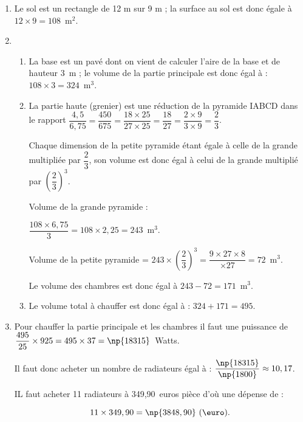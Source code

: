 \begin{enumerate}
\item %
Le sol est un rectangle de 12 m sur 9 m  ; la surface au sol est donc égale à $12 \times 9 = 108$~m$^2$.
\item %


%

	\begin{enumerate}
		\item %
La base est un pavé dont on vient de calculer l'aire de la base et de hauteur 3~m ; le volume de la partie principale est donc égal à : $108 \times 3 = 324$~m$^3$.
		\item %
La partie haute (grenier) est une réduction de la pyramide IABCD dans le rapport $\dfrac{4,5}{6,75} = \dfrac{450}{675} = \dfrac{18 \times 25}{27 \times 25} = \dfrac{18}{27}  = \dfrac{2 \times 9}{3 \times 9} = \dfrac{2}{3}$.

Chaque dimension de la petite pyramide étant égale à celle de la grande multipliée par $\dfrac{2}{3}$, son volume est donc égal à celui de la grande multiplié par $\left(\dfrac{2}{3} \right)^3$.

Volume de la grande pyramide :

$\dfrac{108 \times 6,75}{3} = 108 \times 2,25 = 243$~m$^3$.

Volume de la petite pyramide = $243 \times \left(\dfrac{2}{3} \right)^3 = \dfrac{9 \times 27 \times 8}{\times 27} = 72$~m$^3$.

Le volume des chambres est donc égal à $243 - 72 = 171$~m$^3$.
		\item %
Le volume total à chauffer est donc égal à : $324 + 171 = 495$.
	\end{enumerate}
\item  %
%	
%	
Pour chauffer la partie principale et les chambres il faut une puissance de $\dfrac{495}{25} \times 925 = 495 \times 37 = \np{18315}$~Watts.

Il faut donc acheter un nombre de radiateurs égal à : $\dfrac{\np{18315}}{\np{1800}} \approx 10,17$.

IL faut acheter 11 radiateurs à 349,90~euros pièce d'où une dépense de :

\[11 \times 349,90 = \np{3848,90}~(\text{\euro}).\]

\end{enumerate} 
